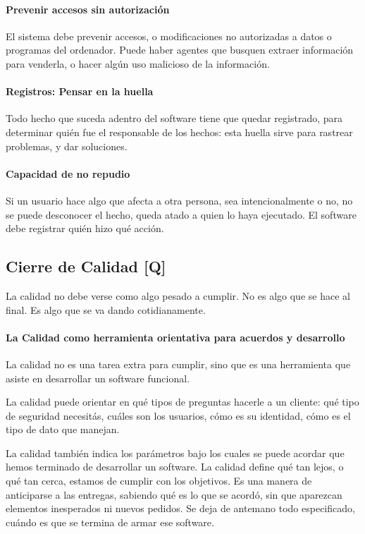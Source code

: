 \hypertarget{noaccess}{%
\paragraph{Prevenir accesos sin autorización}\label{noaccess}}
  El sistema debe prevenir
  accesos, o modificaciones no autorizadas a datos o programas del
  ordenador. Puede haber agentes que busquen extraer información para
  venderla, o hacer algún uso malicioso de la información.

\hypertarget{huellas}{%
\paragraph{Registros: Pensar en la huella}\label{huellas}}
 Todo hecho que suceda adentro
  del software tiene que quedar registrado, para determinar quién fue el
  responsable de los hechos: esta huella sirve para rastrear problemas, y
  dar soluciones.

\hypertarget{norepudio}{%
\paragraph{Capacidad de no repudio}\label{norepudio}}
  Si un usuario hace algo que afecta a
  otra persona, sea intencionalmente o no, no se puede desconocer el
  hecho, queda atado a quien lo haya ejecutado. El software debe
  registrar quién hizo qué acción.


\hypertarget{cierre-de-calidad-q}{%
\subsection{Cierre de Calidad {[}Q{]}}\label{cierre-de-calidad-q}}

La calidad no debe verse como algo pesado a cumplir. No es algo que se
hace al final. Es algo que se va dando cotidianamente.

\paragraph{La Calidad como herramienta orientativa para acuerdos y desarrollo}
La calidad no es una tarea
extra para cumplir, sino que es una herramienta que asiste en
desarrollar un software funcional.

La calidad puede orientar en qué tipos de preguntas hacerle a un
cliente: qué tipo de seguridad necesitás, cuáles son los usuarios, cómo
es su identidad, cómo es el tipo de dato que manejan.

La calidad también indica los parámetros bajo los cuales se puede
acordar que hemos terminado de desarrollar un software. La calidad
define qué tan lejos, o qué tan cerca, estamos de cumplir con los
objetivos. Es una manera de anticiparse a las entregas, sabiendo qué es
lo que se acordó, sin que aparezcan elementos inesperados ni nuevos
pedidos. Se deja de antemano todo especificado, cuándo es que se termina
de armar ese software.

\onecolumn
